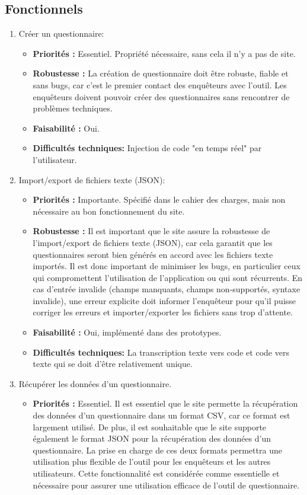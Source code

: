 \documentclass{article}
\begin{document}
\subsection{Fonctionnels}
\begin{enumerate}[noitemsep]
\item Créer un questionnaire:
\begin{itemize}[noitemsep]
\item \textbf{Priorités : }Essentiel. Propriété nécessaire, sans cela il n'y a pas de site.
\item \textbf{Robustesse : } La création de questionnaire doit être robuste, fiable et sans bugs, car c'est le premier contact des enquêteurs avec l'outil. Les enquêteurs doivent pouvoir créer des questionnaires sans rencontrer de problèmes techniques.
\item \textbf{Faisabilité : }Oui.
\item \textbf{Difficultés techniques: } Injection de code "en temps réel" par l'utilisateur.
\end{itemize}
\newpage
\item Import/export de fichiers texte (JSON):
\begin{itemize}[noitemsep]
    \item \textbf{Priorités : }Importante. Spécifié dans le cahier des charges, mais non nécessaire au bon fonctionnement du site.

    \item \textbf{Robustesse : }Il est important que le site assure la robustesse de l'import/export de fichiers texte (JSON), car cela garantit que les questionnaires seront bien générés en accord avec les fichiers texte importés. Il est donc important de minimiser les bugs, en particulier ceux qui compromettent l'utilisation de l'application ou qui sont récurrents. En cas d'entrée invalide (champs manquants, champs non-supportés, syntaxe invalide), une erreur explicite doit informer l'enquêteur pour qu'il puisse corriger les erreurs et importer/exporter les fichiers sans trop d'attente.
    \item \textbf{Faisabilité : }Oui, implémenté dans des prototypes.
    \item \textbf{Difficultés techniques: } La transcription texte vers code et code vers texte qui se doit d'être relativement unique.
\end{itemize}



\item Récupérer les données d'un questionnaire.
\begin{itemize}[noitemsep]
    \item \textbf{Priorités : }Essentiel. Il est essentiel que le site permette la récupération des données d'un questionnaire dans un format CSV, car ce format est largement utilisé. De plus, il est souhaitable que le site supporte également le format JSON pour la récupération des données d'un questionnaire. La prise en charge de ces deux formats permettra une utilisation plus flexible de l'outil pour les enquêteurs et les autres utilisateurs. Cette fonctionnalité est considérée comme essentielle et nécessaire pour assurer une utilisation efficace de l'outil de questionnaire.


\end{itemize}
\end{enumerate}
\end{document}
